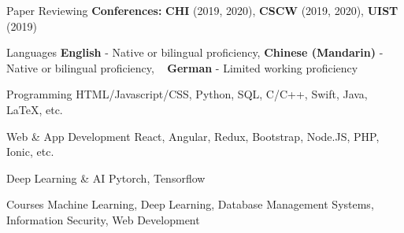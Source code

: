 
\begin{cvskills}
  \cvskill
    {Paper Reviewing} %
    {
      \textbf{Conferences:} \textbf{CHI} (2019, 2020), \textbf{CSCW} (2019, 2020), \textbf{UIST} (2019)
    } 


  
\end{cvskills}








\begin{cvskills}
  \cvskill
    {Languages} %
    {\textbf{English} - Native or bilingual proficiency, \textbf{Chinese (Mandarin)} - Native or bilingual proficiency, } 
  \cvskill
    {~} %
    {\textbf{German} - Limited working proficiency} 
  
  \cvskill
    {Programming} %
    {HTML/Javascript/CSS, Python, SQL, C/C++, Swift, Java, LaTeX, etc. } 

  \cvskill
    {Web \& App Development} %
    {React, Angular, Redux, Bootstrap, Node.JS, PHP, Ionic, etc.} 

  \cvskill
    {Deep Learning \& AI}
    {Pytorch, Tensorflow} 

  \cvskill
    {Courses} %
    {Machine Learning, Deep Learning, Database Management Systems, Information Security, Web Development} 
\end{cvskills}
